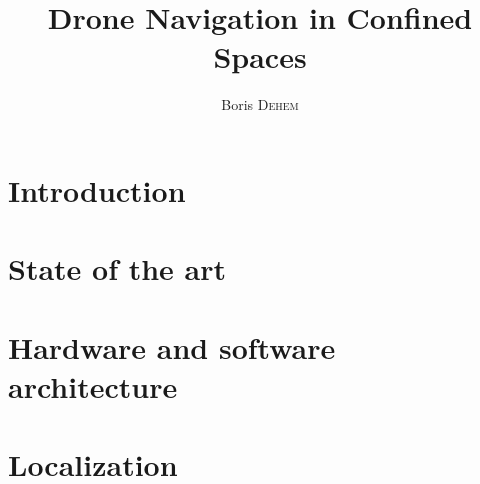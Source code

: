 \documentclass{eplmastersthesis}
\title{Drone Navigation in Confined Spaces}
\author{Boris \textsc{Dehem}}
\begin{document}







\tableofcontents

\printglossaries

\chapter{Introduction}


\chapter{State of the art}


\chapter{Hardware and software architecture}


\chapter{Localization}

\end{document}
